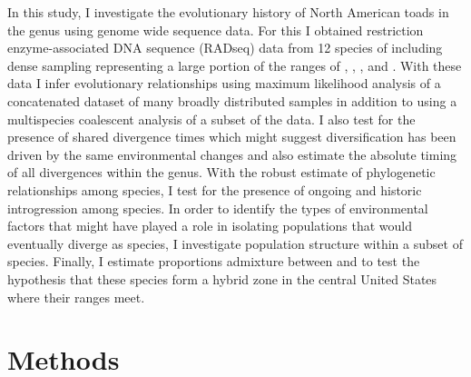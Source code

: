 

In this study, I investigate the evolutionary history of North American
toads in the genus \anaxyrus using genome wide sequence data. 
For this I obtained restriction enzyme-associated DNA sequence (RADseq) data
from 12 species of \anaxyrus including dense sampling representing a 
large portion of the ranges of \amer, \fowl, \terr, and \wood.
With these data I infer evolutionary relationships using maximum likelihood analysis  
of a concatenated dataset of many broadly distributed samples in addition to 
using a multispecies coalescent analysis of a subset of the data.
I also test for the presence of shared divergence times which might suggest
\anaxyrus diversification has been driven by the same environmental changes
and also estimate the absolute timing of all divergences within the genus.
With the robust estimate of phylogenetic relationships among \anaxyrus species, 
I test for the presence of ongoing and historic introgression among \anaxyrus species.
In order to identify the types of environmental factors that might have played
a role in isolating populations that would eventually diverge as species,
I investigate population structure within a subset of \anaxyrus species.
Finally, I estimate proportions admixture between \fowl and \wood to test
the hypothesis that these species form a hybrid zone in the central United  
States where their ranges meet.



\section{Methods}
